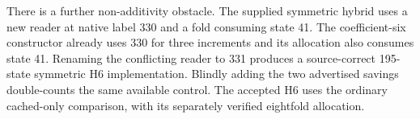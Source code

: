 There is a further non-additivity obstacle. The supplied symmetric hybrid
uses a new reader at native label 330 and a fold consuming state 41. The
coefficient-six constructor already uses 330 for three increments and its
allocation also consumes state 41. Renaming the conflicting reader to 331
produces a source-correct 195-state symmetric H6 implementation. Blindly
adding the two advertised savings double-counts the same available control.
The accepted H6 uses the ordinary cached-only comparison, with its separately
verified eightfold allocation.
